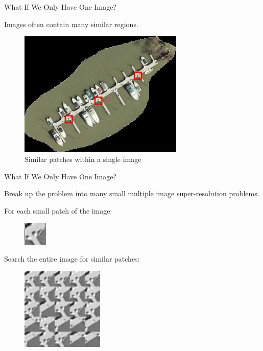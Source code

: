 \documentclass{beamer}
\begin{document}

\begin{frame}{What If We Only Have One Image?}

\vspace{0.3cm}

Images often contain many similar regions.

\vspace{0.3cm}

\begin{figure}
\centering
\includegraphics[width=0.7\textwidth]{boatsmall_similar_patches.jpg}
\caption{Similar patches within a single image}
\end{figure}

\end{frame}


\begin{frame}{What If We Only Have One Image?}

Break up the problem into many small multiple image super-resolution problems.

\vspace{0.3cm}

For each small patch of the image:

\begin{figure}
\centering
\includegraphics[width=0.1\textwidth]{similar_patches_3.png}
\end{figure}

Search the entire image for similar patches:

\begin{figure}
\centering
\includegraphics[width=0.35\textwidth]{similar_patches_2.png}
\end{figure}

\end{frame}
\end{document}
